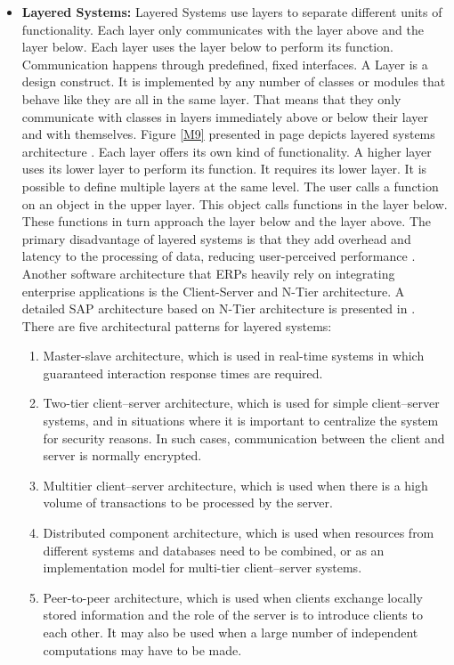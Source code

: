 \documentclass[12pt,a4paper,final,twoside,onecolumn,titlepage]{book}
\begin{document}
\begin{itemize}
\item \textbf{Layered Systems:} Layered Systems use layers to separate different units of functionality. Each layer only communicates with the layer above and the layer below. Each layer uses the layer below to perform its function. Communication happens through predefined, fixed interfaces.  A Layer is a design construct. It is implemented by any number of classes or modules that behave like they are all in the same layer. That means that they only communicate with classes in layers immediately above or below their layer and with themselves. Figure \ref{M9} presented in page \pageref{M9} depicts layered systems architecture \cite{M10}. Each layer offers its own kind of functionality. A higher layer uses its lower layer to perform its function. It requires its lower layer. It is possible to define multiple layers at the same level. The user calls a function on an object in the upper layer. This object calls functions in the layer below. These functions in turn approach the layer below and the layer above. The primary disadvantage of layered systems is that they add overhead and latency to the processing of data, reducing user-perceived performance \cite{M46}. Another software architecture that ERPs heavily rely on integrating enterprise applications is the Client-Server and N-Tier architecture. A detailed SAP architecture based on N-Tier architecture is presented in \cite{M47}. There are five architectural patterns for layered systems:
\begin{enumerate}
\item Master-slave architecture, which is used in real-time systems in which guaranteed interaction response times are required.
\item Two-tier client–server architecture, which is used for simple client–server systems, and in situations where it is important to centralize the system for security reasons. In such cases, communication between the client and server is normally encrypted.
\item Multitier client–server architecture, which is used when there is a high volume of transactions to be processed by the server.
\item Distributed component architecture, which is used when resources from different systems and databases need to be combined, or as an implementation model for multi-tier client–server systems.
\item Peer-to-peer architecture, which is used when clients exchange locally stored information and the role of the server is to introduce clients to each other. It may also be used when a large number of independent computations may have to be made.
\end{enumerate}


\end{itemize}
\end{document}
